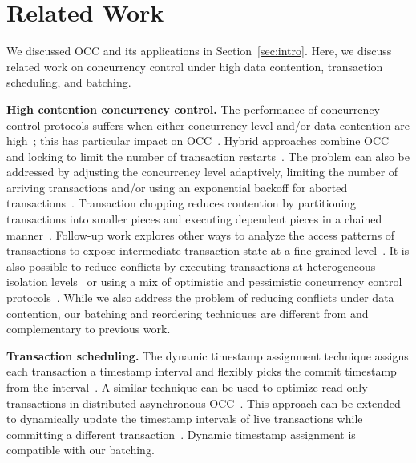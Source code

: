 \section{Related Work}\label{sec:relwork}

We discussed OCC and its applications in Section~\ref{sec:intro}. 
Here, we discuss related work on concurrency control under high data contention, transaction scheduling, and batching. 

{\bf High contention concurrency control.}
The performance of concurrency control protocols suffers when either concurrency level and/or data contention are high~\cite{franaszek1985limitations}; this has particular impact on OCC~\cite{agrawal1987concurrency}. Hybrid approaches combine OCC and locking to limit the number of transaction restarts~\cite{thomasian1998distributed,yu1992analysis}. The problem can also be addressed by adjusting the concurrency level adaptively, limiting the number of arriving transactions and/or using an exponential backoff for aborted transactions~\cite{helal1993adaptive}. Transaction chopping reduces contention by partitioning transactions into smaller pieces and executing dependent pieces in a chained manner~\cite{mu2014extracting,shasha1995transaction,xie2015high}. Follow-up work explores other ways to analyze the access patterns of transactions to expose intermediate transaction state at a fine-grained level~\cite{wang2016scaling}. It is also possible to reduce conflicts by executing transactions at heterogeneous isolation levels~\cite{xie2014salt,xie2015high} or using a mix of optimistic and pessimistic concurrency control protocols~\cite{wang2016mostly}. While we also address the problem of reducing conflicts under data contention, our batching and reordering techniques are different from and complementary to previous work.

{\bf Transaction scheduling.}
The dynamic timestamp assignment technique assigns each transaction a timestamp interval and flexibly picks the commit timestamp from the interval~\cite{bayer1982dynamic}. A similar technique can be used to optimize read-only transactions in distributed asynchronous OCC~\cite{ding2015centiman}. This approach can be extended to dynamically update the timestamp intervals of live transactions while committing a different transaction~\cite{boksenbaum1987concurrent}. Dynamic timestamp assignment is compatible with our batching.

